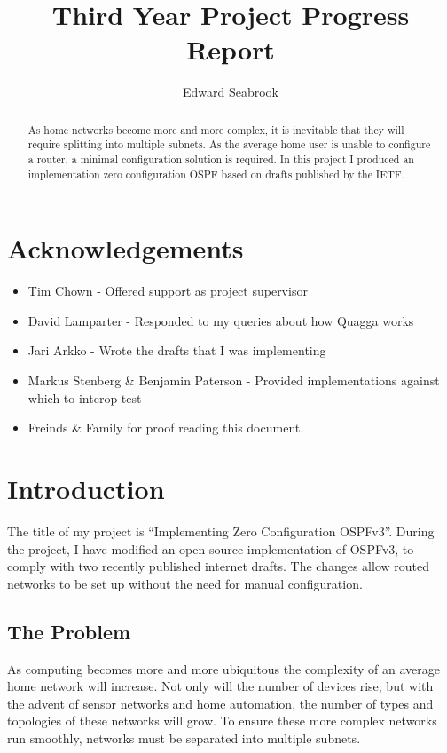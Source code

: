 \documentclass[12pt]{report}
\author{Edward Seabrook}
\title{Third Year Project Progress Report}
\begin{document}


\begin{abstract}
As home networks become more and more complex, it is inevitable that they will
require splitting into multiple subnets. As the average home user is unable to
configure a router, a minimal configuration solution is required. In this
project I produced an implementation zero configuration OSPF based on drafts
published by the IETF. 
\end{abstract}

\tableofcontents
\clearpage

\chapter{Acknowledgements}

\begin{itemize}
\item Tim Chown - Offered support as project supervisor
\item David Lamparter - Responded to my queries about how Quagga works
\item Jari Arkko - Wrote the drafts that I was implementing
\item Markus Stenberg \& Benjamin Paterson - Provided implementations against which 
      to interop test
\item Freinds \& Family for proof reading this document.
\end{itemize}

\chapter{Introduction}
The title of my project is ``Implementing Zero Configuration OSPFv3''. During the
project, I have modified an open source implementation of OSPFv3, to comply with two
recently published internet drafts. The changes allow routed networks to be set up
without the need for manual configuration.

\section{The Problem}
As computing becomes more and more ubiquitous the complexity of an average home
network will increase. Not only will the number of devices rise, but with the advent
of sensor networks and home automation, the number of types and topologies of 
these networks will grow. To ensure these more complex networks run smoothly, 
networks must be separated into multiple subnets.
\end{document}
